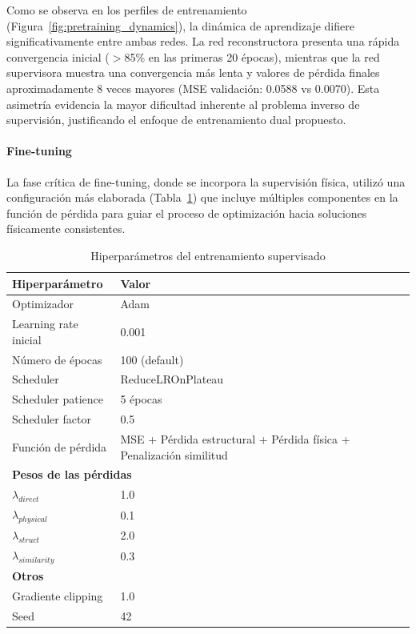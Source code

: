 Como se observa en los perfiles de entrenamiento (Figura~\ref{fig:pretraining_dynamics}), la dinámica de aprendizaje difiere significativamente entre ambas redes. La red reconstructora presenta una rápida convergencia inicial ($>$85\% en las primeras 20 épocas), mientras que la red supervisora muestra una convergencia más lenta y valores de pérdida finales aproximadamente 8 veces mayores (MSE validación: 0.0588 vs 0.0070). Esta asimetría evidencia la mayor dificultad inherente al problema inverso de supervisión, justificando el enfoque de entrenamiento dual propuesto.

\paragraph{Fine-tuning}

La fase crítica de fine-tuning, donde se incorpora la supervisión física, utilizó una configuración más elaborada (Tabla~\ref{tab:hyperparameters_supervised}) que incluye múltiples componentes en la función de pérdida para guiar el proceso de optimización hacia soluciones físicamente consistentes.

\begin{table}[htbp]
    \centering
    \begin{tabular}{ll}
    \hline
    \textbf{Hiperparámetro} & \textbf{Valor} \\
    \hline
    Optimizador & Adam \\
    Learning rate inicial & 0.001 \\
    Número de épocas & 100 (default) \\
    Scheduler & ReduceLROnPlateau \\
    Scheduler patience & 5 épocas \\
    Scheduler factor & 0.5 \\
    Función de pérdida & MSE + Pérdida estructural + Pérdida física + Penalización similitud \\
    \hline
    \multicolumn{2}{l}{\textbf{Pesos de las pérdidas}} \\
    $\lambda_{direct}$ & 1.0 \\
    $\lambda_{physical}$ & 0.1 \\
    $\lambda_{struct}$ & 2.0 \\
    $\lambda_{similarity}$ & 0.3 \\
    \hline
    \textbf{Otros} & \\
    Gradiente clipping & 1.0 \\
    Seed & 42 \\
    \hline
    \end{tabular}
    \caption{Hiperparámetros del entrenamiento supervisado}
    \label{tab:hyperparameters_supervised}
\end{table}

